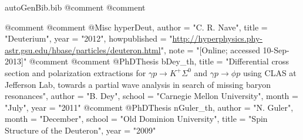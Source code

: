 \begin{filecontents*}{autoGenBib.bib}
@comment %
@comment %

@comment %
@comment %
@Misc{ hyperDeut,
  author = "C. R. Nave",
  title = "Deuterium",
  year = "2012",
  howpublished = "\url{http://hyperphysics.phy-astr.gsu.edu/hbase/particles/deuteron.html}",
  note = "[Online; accessed 10-Sep-2013]"
}
@comment %
@comment %
@PhDThesis{ bDey_th,
	title = "{Differential cross section and polarization extractions for $\gamma p \rightarrow K^{+} \Sigma^{0}$ and $\gamma p \rightarrow \phi p$ using CLAS at Jefferson Lab, towards a partial wave analysis in search of missing baryon resonances}",
	author = "B. Dey",
	school = "Carnegie Mellon University",
	month = "July",
	year = "2011"
}
@comment %
@PhDThesis{ nGuler_th,
	author = "N. Guler",
	month = "December",
	school = "Old Dominion University",
	title = "{Spin Structure of the Deuteron}",
	year = "2009"
}


\end{filecontents*}
